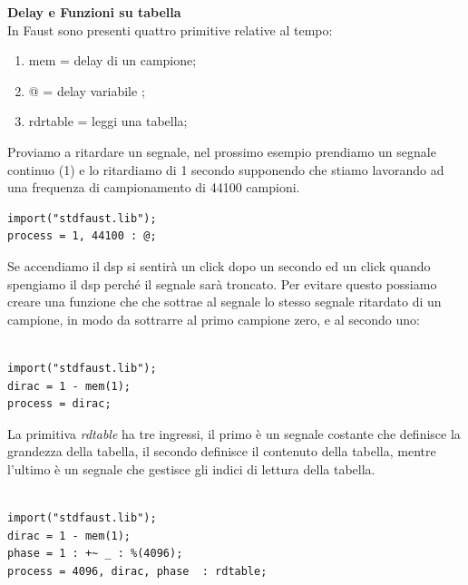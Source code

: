 \documentclass[11pt]{article}
\begin{document}
\begin{multicols*}{2}
\textbf{Delay e Funzioni su tabella}\\

In Faust sono presenti quattro primitive relative al tempo:

\begin{enumerate}
\scriptsize
\item mem =  delay di un campione; 
\item @ = delay variabile ; 
\item rdrtable = leggi una tabella; 
\end{enumerate}

Proviamo a ritardare un segnale, nel prossimo esempio prendiamo un segnale continuo (1) e lo ritardiamo di 1 secondo supponendo che stiamo lavorando ad una frequenza di campionamento di 44100 campioni.

\begin{Verbatim}[fontsize=\scriptsize]
import("stdfaust.lib");
process = 1, 44100 : @;

\end{Verbatim}

Se accendiamo il dsp si sentirà un click dopo un secondo ed un click quando spengiamo il dsp perché il segnale sarà troncato. Per evitare questo possiamo creare una funzione che che sottrae al segnale lo stesso segnale ritardato di un campione, in modo da sottrarre al primo campione zero, e al secondo uno: 

\begin{Verbatim}[fontsize=\scriptsize]

import("stdfaust.lib");
dirac = 1 - mem(1);
process = dirac;

\end{Verbatim}

La primitiva \textit{rdtable} ha tre ingressi, il primo è un segnale costante che definisce la grandezza della tabella, il secondo definisce il contenuto della tabella, mentre l'ultimo è un segnale che gestisce gli indici di lettura della tabella. 

\begin{Verbatim}[fontsize=\scriptsize]

import("stdfaust.lib");
dirac = 1 - mem(1);
phase = 1 : +~ _ : %(4096);
process = 4096, dirac, phase  : rdtable;

\end{Verbatim}


\end{multicols*}
\end{document}
